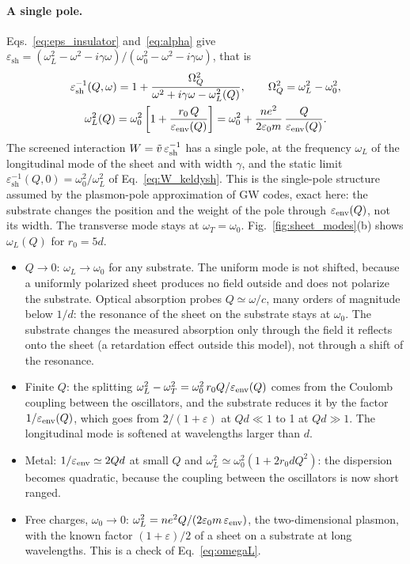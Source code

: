 \documentclass[10pt,a4paper]{paper}
\begin{document}
\paragraph{A single pole.} Eqs.~\eqref{eq:eps_insulator} and~\eqref{eq:alpha} give
$\varepsilon_{\mathrm{sh}} = (\omega_L^2 - \omega^2 - i\gamma\omega)/(\omega_0^2 - \omega^2 - i\gamma\omega)$, that is
\begin{equation}
\begin{gathered}
\varepsilon_{\mathrm{sh}}^{-1}(Q,\omega) = 1 + \frac{\Omega_Q^2}{\omega^2 + i\gamma\omega - \omega_L^2(Q)} , \qquad
\Omega_Q^2 = \omega_L^2 - \omega_0^2 , \\
\omega_L^2(Q) = \omega_0^2\left[1 + \frac{r_0\,Q}{\varepsilon_{\mathrm{env}}(Q)}\right]
= \omega_0^2 + \frac{n e^2}{2\varepsilon_0 m}\,\frac{Q}{\varepsilon_{\mathrm{env}}(Q)} .
\end{gathered}
\label{eq:omegaL}
\end{equation}
The screened interaction $W = \tilde{v}\,\varepsilon_{\mathrm{sh}}^{-1}$ has a single pole, at the frequency $\omega_L$ of
the longitudinal mode of the sheet and with width $\gamma$, and the static limit
$\varepsilon_{\mathrm{sh}}^{-1}(Q,0) = \omega_0^2/\omega_L^2$ of Eq.~\eqref{eq:W_keldysh}. This is the single-pole
structure assumed by the plasmon-pole approximation of GW codes, exact here: the substrate changes the position and
the weight of the pole through $\varepsilon_{\mathrm{env}}(Q)$, not its width. The transverse mode stays at
$\omega_T = \omega_0$. Fig.~\ref{fig:sheet_modes}(b) shows $\omega_L(Q)$ for $r_0 = 5d$.
\begin{itemize}
\item $Q \to 0$: $\omega_L \to \omega_0$ for any substrate. The uniform mode is not shifted, because a uniformly
  polarized sheet produces no field outside and does not polarize the substrate. Optical absorption probes
  $Q \simeq \omega/c$, many orders of magnitude below $1/d$: the resonance of the sheet on the substrate stays at
  $\omega_0$. The substrate changes the measured absorption only through the field it reflects onto the sheet
  (a retardation effect outside this model), not through a shift of the resonance.
\item Finite $Q$: the splitting $\omega_L^2 - \omega_T^2 = \omega_0^2\,r_0Q/\varepsilon_{\mathrm{env}}(Q)$ comes from the Coulomb
  coupling between the oscillators, and the substrate reduces it by the factor $1/\varepsilon_{\mathrm{env}}(Q)$, which goes from
  $2/(1 + \varepsilon)$ at $Qd \ll 1$ to 1 at $Qd \gg 1$. The longitudinal mode is softened at wavelengths larger
  than $d$.
\item Metal: $1/\varepsilon_{\mathrm{env}} \simeq 2Qd$ at small $Q$ and $\omega_L^2 \simeq \omega_0^2(1 + 2r_0dQ^2)$: the dispersion
  becomes quadratic, because the coupling between the oscillators is now short ranged.
\item Free charges, $\omega_0 \to 0$: $\omega_L^2 = ne^2Q/(2\varepsilon_0 m\,\varepsilon_{\mathrm{env}})$, the two-dimensional plasmon,
  with the known factor $(1 + \varepsilon)/2$ of a sheet on a substrate at long wavelengths. This is a check of
  Eq.~\eqref{eq:omegaL}.
\end{itemize}
\end{document}
